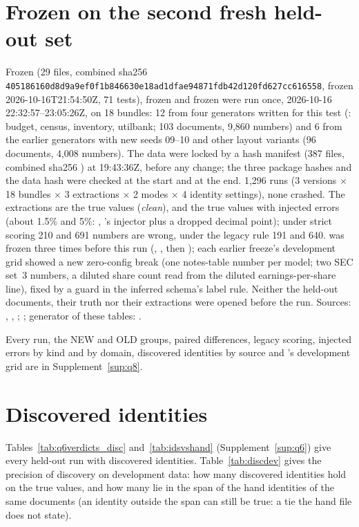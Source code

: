 \section{Frozen  on the second fresh held-out set}\label{app:q8}
Frozen  (29 files, combined sha256 {\small\nolinkurl{405186160d8d9a9ef0f1b846630e18ad1dfae94871fdb42d120fd627cc616558}}, frozen 2026-10-16T21:54:50Z, 71 tests), frozen  and frozen  were run once, 2026-10-16 22:32:57--23:05:26Z, on 18 bundles: 12 from four generators written for this test (: budget, census, inventory, utilbank; 103 documents, 9,860 numbers) and 6 from the earlier generators with new seeds 09--10 and other layout variants (96 documents, 4,008 numbers). The data were locked by a hash manifest (387 files, combined sha256 ) at 19:43:36Z, before any  change; the three package hashes and the data hash were checked at the start and at the end. 1,296 runs (3 versions $\times$ 18 bundles $\times$ 3 extractions $\times$ 2 modes $\times$ 4 identity settings), none crashed. The extractions are the true values (\emph{clean}), and the true values with injected errors (about 1.5\% and 5\%: , 's injector plus a dropped decimal point); under strict scoring 210 and 691 numbers are wrong, under the legacy rule 191 and 640.  was frozen three times before this run (, , then ); each earlier freeze's development grid showed a new zero-config break (one notes-table number per model; two SEC set~3 numbers, a diluted share count read from the diluted earnings-per-share line), fixed by a guard in the inferred schema's label rule. Neither the held-out documents, their truth nor their extractions were opened before the run. Sources: , , ; ; generator of these tables: .




Every run, the NEW and OLD groups, paired differences, legacy scoring, injected errors by kind and by domain, discovered identities by source and 's development grid are in Supplement~\ref{sup:q8}.

\section{Discovered identities}\label{app:ids}
Tables~\ref{tab:q6verdicts_disc} and~\ref{tab:idsvshand} (Supplement~\ref{sup:q6}) give every held-out run with discovered identities. Table~\ref{tab:discdev} gives the precision of discovery on development data: how many discovered identities hold on the true values, and how many lie in the span of the hand identities of the same documents (an identity outside the span can still be true: a tie the hand file does not state).

